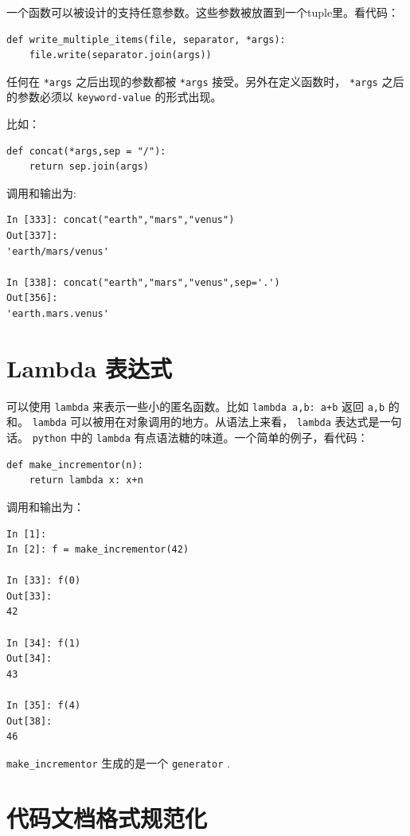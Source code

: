 \documentclass[10pt,a4paper,UTF8]{article}
\begin{document}
一个函数可以被设计的支持任意参数。这些参数被放置到一个tuple里。看代码：
\lstset{language=Python,label= ,caption= ,captionpos=b,firstnumber=1,numbers=left}
\begin{lstlisting}
def write_multiple_items(file, separator, *args):
    file.write(separator.join(args))
\end{lstlisting}

任何在 \texttt{*args} 之后出现的参数都被 \texttt{*args} 接受。另外在定义函数时， \texttt{*args} 之后的参数必须以 \texttt{keyword-value} 的形式出现。

比如：
\lstset{language=Python,label= ,caption= ,captionpos=b,firstnumber=1,numbers=left}
\begin{lstlisting}
def concat(*args,sep = "/"):
    return sep.join(args)
\end{lstlisting}
调用和输出为:
\begin{verbatim}
In [333]: concat("earth","mars","venus")
Out[337]: 
'earth/mars/venus'

In [338]: concat("earth","mars","venus",sep='.')
Out[356]: 
'earth.mars.venus'
\end{verbatim}
\section{Lambda 表达式}
\label{sec:orgb84aaf1}


可以使用 \texttt{lambda} 来表示一些小的匿名函数。比如 \texttt{lambda a,b: a+b} 返回 \texttt{a,b} 的和。 \texttt{lambda} 可以被用在对象调用的地方。从语法上来看， \texttt{lambda} 表达式是一句话。 \texttt{python} 中的 \texttt{lambda} 有点语法糖的味道。一个简单的例子，看代码：
\lstset{language=Python,label= ,caption= ,captionpos=b,firstnumber=1,numbers=left}
\begin{lstlisting}
def make_incrementor(n):
    return lambda x: x+n
\end{lstlisting}

调用和输出为：
\begin{verbatim}
In [1]: 
In [2]: f = make_incrementor(42)

In [33]: f(0)
Out[33]: 
42

In [34]: f(1)
Out[34]: 
43

In [35]: f(4)
Out[38]: 
46
\end{verbatim}

\texttt{make\_incrementor} 生成的是一个 \texttt{generator} .

\section{代码文档格式规范化}
\label{sec:org3565b61}
\end{document}
